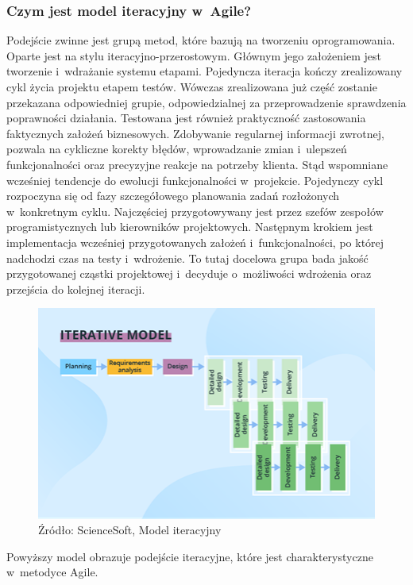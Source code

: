 \documentclass[oneside,polski,logo]{amuthesis}
\begin{document}
\subsubsection{Czym jest model iteracyjny w~Agile?}
Podejście zwinne jest grupą metod, które bazują na tworzeniu oprogramowania. Oparte jest na stylu iteracyjno-przerostowym. Głównym jego założeniem jest tworzenie i~wdrażanie systemu etapami. Pojedyncza iteracja kończy zrealizowany cykl życia projektu etapem testów. Wówczas zrealizowana już część zostanie przekazana odpowiedniej grupie, odpowiedzialnej za przeprowadzenie sprawdzenia poprawności działania. Testowana jest również praktyczność zastosowania faktycznych założeń biznesowych. Zdobywanie regularnej informacji zwrotnej, pozwala na cykliczne korekty błędów, wprowadzanie zmian i~ulepszeń funkcjonalności oraz precyzyjne reakcje na potrzeby klienta. Stąd wspomniane wcześniej tendencje do ewolucji funkcjonalności w~projekcie. Pojedynczy cykl rozpoczyna się od fazy szczegółowego planowania zadań rozłożonych w~konkretnym cyklu. Najczęściej przygotowywany jest przez szefów zespołów programistycznych lub kierowników projektowych. Następnym krokiem jest implementacja wcześniej przygotowanych założeń i~funkcjonalności, po której nadchodzi czas na testy i~wdrożenie. To tutaj docelowa grupa bada jakość przygotowanej cząstki projektowej i~decyduje o~możliwości wdrożenia oraz przejścia do kolejnej iteracji.

\begin{figure}[h]
	\centering
	\includegraphics[width=15cm]{images/hyps/iterative-model.png}
	\caption{Źródło: ScienceSoft, Model iteracyjny \cite{wykresy}}
\end{figure}

Powyższy model obrazuje podejście iteracyjne, które jest charakterystyczne w~metodyce Agile.
\end{document}
